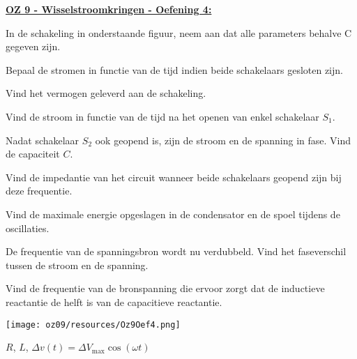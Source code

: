 \textbf{\underline{OZ 9 - Wisselstroomkringen - Oefening 4:}}
\vspace{0.5cm}

In de schakeling in onderstaande figuur, neem aan dat alle parameters behalve C gegeven zijn.

\begin{enumerate}[(a)]
    \item Bepaal de stromen in functie van de tijd indien beide schakelaars gesloten zijn.
    \item Vind het vermogen geleverd aan de schakeling. \vspace{0.3cm} \\ 
\begin{minipage}{.56\textwidth}
    \item Vind de stroom in functie van de tijd na het openen van enkel schakelaar $S_1$.   
    \item Nadat schakelaar $S_2$ ook geopend is, zijn de stroom en de spanning in fase. Vind de capaciteit $C$.
    \item Vind de impedantie van het circuit wanneer beide schakelaars geopend zijn bij deze frequentie.
    \item Vind de maximale energie opgeslagen in de condensator en de spoel tijdens de oscillaties.
    \item De frequentie van de spanningsbron wordt nu verdubbeld. Vind het faseverschil tussen de stroom en de spanning.
    \item Vind de frequentie van de bronspanning die ervoor zorgt dat de inductieve reactantie de helft is van de capacitieve reactantie.
\end{minipage}
\begin{minipage}{.4\textwidth}
   \vspace{-0.5cm}\texttt{[image: oz09/resources/Oz9Oef4.png]}
\end{minipage}

\end{enumerate}

\begin{description}[labelwidth=1.5cm, leftmargin=!]
    \item[Geg. :]  $R$, $L$, $\Delta v(t) = \Delta V_\text{max} \cos(\omega t)$
\end{description}

